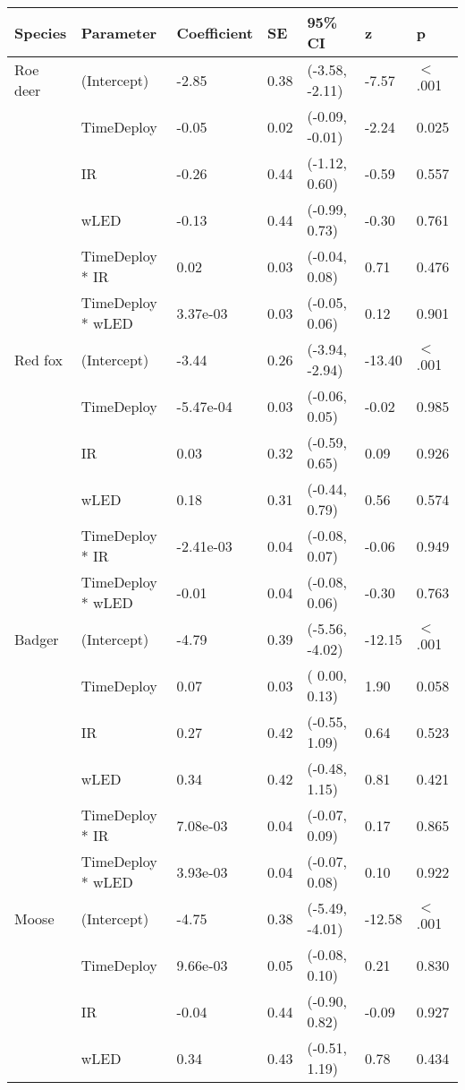 \centering
\begin{tabular}{lllllll}
  \hline
Species & Parameter & Coefficient & SE & 95\% CI & z & p \\ 
  \hline
Roe deer & (Intercept) & -2.85 & 0.38 & (-3.58, -2.11) & -7.57 & $<$ .001 \\ 
   & TimeDeploy & -0.05 & 0.02 & (-0.09, -0.01) & -2.24 & 0.025  \\ 
   & IR & -0.26 & 0.44 & (-1.12,  0.60) & -0.59 & 0.557  \\ 
   & wLED & -0.13 & 0.44 & (-0.99,  0.73) & -0.30 & 0.761  \\ 
   & TimeDeploy * IR & 0.02 & 0.03 & (-0.04,  0.08) & 0.71 & 0.476  \\ 
   & TimeDeploy * wLED & 3.37e-03 & 0.03 & (-0.05,  0.06) & 0.12 & 0.901  \\ 
  Red fox & (Intercept) & -3.44 & 0.26 & (-3.94, -2.94) & -13.40 & $<$ .001 \\ 
   & TimeDeploy & -5.47e-04 & 0.03 & (-0.06,  0.05) & -0.02 & 0.985  \\ 
   & IR & 0.03 & 0.32 & (-0.59,  0.65) & 0.09 & 0.926  \\ 
   & wLED & 0.18 & 0.31 & (-0.44,  0.79) & 0.56 & 0.574  \\ 
   & TimeDeploy * IR & -2.41e-03 & 0.04 & (-0.08,  0.07) & -0.06 & 0.949  \\ 
   & TimeDeploy * wLED & -0.01 & 0.04 & (-0.08,  0.06) & -0.30 & 0.763  \\ 
  Badger & (Intercept) & -4.79 & 0.39 & (-5.56, -4.02) & -12.15 & $<$ .001 \\ 
   & TimeDeploy & 0.07 & 0.03 & ( 0.00,  0.13) & 1.90 & 0.058  \\ 
   & IR & 0.27 & 0.42 & (-0.55,  1.09) & 0.64 & 0.523  \\ 
   & wLED & 0.34 & 0.42 & (-0.48,  1.15) & 0.81 & 0.421  \\ 
   & TimeDeploy * IR & 7.08e-03 & 0.04 & (-0.07,  0.09) & 0.17 & 0.865  \\ 
   & TimeDeploy * wLED & 3.93e-03 & 0.04 & (-0.07,  0.08) & 0.10 & 0.922  \\ 
  Moose & (Intercept) & -4.75 & 0.38 & (-5.49, -4.01) & -12.58 & $<$ .001 \\ 
   & TimeDeploy & 9.66e-03 & 0.05 & (-0.08,  0.10) & 0.21 & 0.830  \\ 
   & IR & -0.04 & 0.44 & (-0.90,  0.82) & -0.09 & 0.927  \\ 
   & wLED & 0.34 & 0.43 & (-0.51,  1.19) & 0.78 & 0.434  \\ 

\end{tabular}
